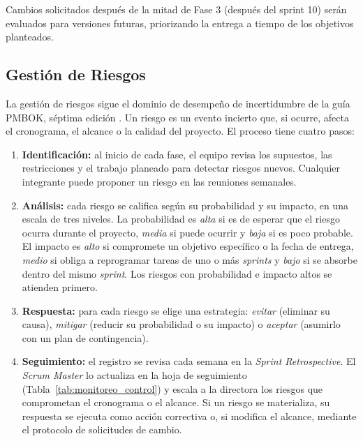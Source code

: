 \documentclass{article}
\begin{document}
Cambios solicitados después de la mitad de Fase 3 (después del sprint 10) serán evaluados para versiones futuras, priorizando la entrega a tiempo de los objetivos planteados.

\subsection{Gestión de Riesgos}
\label{sec:gestion_riesgos}

La gestión de riesgos sigue el dominio de desempeño de incertidumbre de la guía PMBOK, séptima edición \cite{pmbok7}. Un riesgo es un evento incierto que, si ocurre, afecta el cronograma, el alcance o la calidad del proyecto. El proceso tiene cuatro pasos:

\begin{enumerate}
    \item \textbf{Identificación:} al inicio de cada fase, el equipo revisa los supuestos, las restricciones y el trabajo planeado para detectar riesgos nuevos. Cualquier integrante puede proponer un riesgo en las reuniones semanales.

    \item \textbf{Análisis:} cada riesgo se califica según su probabilidad y su impacto, en una escala de tres niveles. La probabilidad es \textit{alta} si es de esperar que el riesgo ocurra durante el proyecto, \textit{media} si puede ocurrir y \textit{baja} si es poco probable. El impacto es \textit{alto} si compromete un objetivo específico o la fecha de entrega, \textit{medio} si obliga a reprogramar tareas de uno o más \textit{sprints} y \textit{bajo} si se absorbe dentro del mismo \textit{sprint}. Los riesgos con probabilidad e impacto altos se atienden primero.

    \item \textbf{Respuesta:} para cada riesgo se elige una estrategia: \textit{evitar} (eliminar su causa), \textit{mitigar} (reducir su probabilidad o su impacto) o \textit{aceptar} (asumirlo con un plan de contingencia).

    \item \textbf{Seguimiento:} el registro se revisa cada semana en la \textit{Sprint Retrospective}. El \textit{Scrum Master} lo actualiza en la hoja de seguimiento (Tabla~\ref{tab:monitoreo_control}) y escala a la directora los riesgos que comprometan el cronograma o el alcance. Si un riesgo se materializa, su respuesta se ejecuta como acción correctiva o, si modifica el alcance, mediante el protocolo de solicitudes de cambio.
\end{enumerate}
\end{document}
